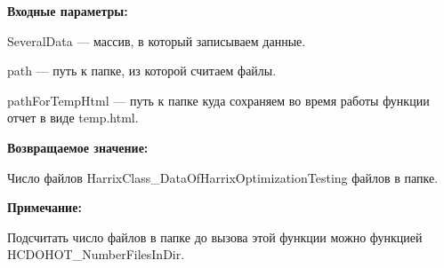 \textbf{Входные параметры:}
 
    SeveralData --- массив, в который записываем данные.
 
    path --- путь к папке, из которой считаем файлы.
 
    pathForTempHtml --- путь к папке куда сохраняем во время работы функции отчет в виде temp.html.

\textbf{Возвращаемое значение:}

 
Число файлов HarrixClass\_DataOfHarrixOptimizationTesting файлов в папке.

\textbf{Примечание:}

Подсчитать число файлов в папке до вызова этой функции можно функцией HCDOHOT\_NumberFilesInDir.